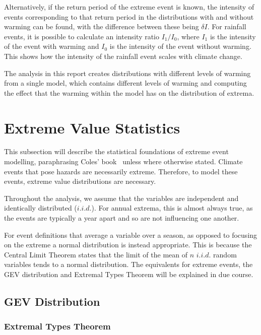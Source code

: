 Alternatively,
    if the return period of the extreme event is known,
    the intensity of events corresponding to that return period in the distributions with and without warming can be found,
    with the difference between these being $\delta I$.
For rainfall events, it is possible to calculate an intensity ratio $I_1 / I_0$, where $I_1$ is the intensity of the event
    with warming and $I_0$ is the intensity of the event without warming.
This shows how the intensity of the rainfall event scales with climate change.

The analysis in this report creates distributions with different levels of warming from a single model,
    which contains different levels of warming
    and computing the effect that the warming within the model has on the distribution of extrema.

\section{Extreme Value Statistics}\label{sec:exstats}

This subsection will describe the statistical foundations of extreme event modelling,
    paraphrasing Coles' book~\cite{Coles_2001} unless where otherwise stated.
Climate events that pose hazards are necessarily extreme.
Therefore, to model these events,
    extreme value distributions are necessary.

Throughout the analysis,
    we assume that the variables are independent and identically distributed ($i.i.d.$).
For annual extrema,
    this is almost always true,
    as the events are typically a year apart and so are not influencing one another.

For event definitions that average a variable over a season,
    as opposed to focusing on the extreme
    a normal distribution is instead appropriate.
This is because the Central Limit Theorem states that the limit of the mean of $n$ $i.i.d.$ random variables tends to a normal distribution.
The equivalents for extreme events, the GEV distribution and Extremal Types Theorem
    will be explained in due course.

\subsection{GEV Distribution}\label{subsec:gev}

\subsubsection{Extremal Types Theorem}

